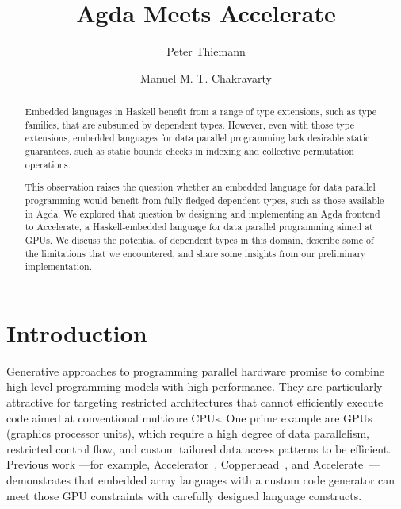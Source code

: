 \documentclass{llncs}
\begin{document}
%
\title{Agda Meets Accelerate}
\author{Peter Thiemann \and Manuel M. T. Chakravarty}

\maketitle              %

\begin{abstract}  
  Embedded languages in Haskell benefit from a range of type extensions, such as type families, that are subsumed by dependent types. However, even with those type extensions, embedded languages for data parallel programming lack desirable static guarantees, such as static bounds checks in indexing and collective permutation operations.
  
  This observation raises the question whether an embedded language
  for data parallel programming would benefit from fully-fledged
  dependent types, such as those available in Agda. We explored that
  question by designing and implementing an Agda frontend to
  Accelerate, a Haskell-embedded language for data parallel programming aimed at GPUs. We discuss the potential of dependent types in this domain, describe some of the limitations that we encountered, and share some insights from our preliminary implementation.
\end{abstract}
\thispagestyle{plain}
\pagestyle{plain}
%
\section{Introduction}
\label{sec:introduction}

Generative approaches to programming parallel hardware promise to
combine high-level programming models with high performance. They are
particularly attractive for targeting restricted architectures that cannot efficiently execute
code aimed at conventional multicore CPUs. One prime example are GPUs
(graphics processor units), which require a
high degree of data parallelism, restricted control flow, and
custom tailored data access patterns to be efficient. Previous work
---for example, Accelerator~\cite{Tarditi:2006},
Copperhead~\cite{Catanzaro:EECS-2010-124}, and
Accelerate~\cite{ChakravartyKellerLeeMcdonellGrover2011}---
demonstrates that embedded array languages with a custom code
generator can meet those GPU constraints with carefully designed language constructs.
\end{document}
